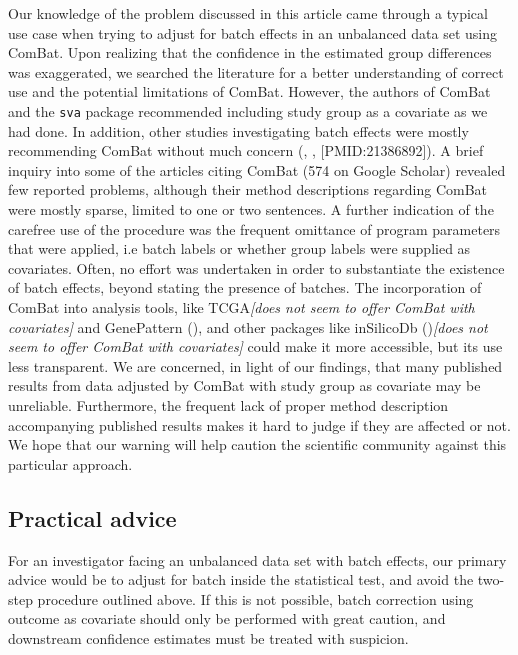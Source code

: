 \documentclass{bio}
\newcommand\COMMENT[2]{\textcolor{COMMENTcol}{#1}\NOTE{#2}}
\newcommand\NB[1]{\textcolor{NBcol}{\textit{#1}}}
\newcommand\NOTE[1]{\NB{[#1]}}
\newcommand\CITE[1]{\textcolor{CITEcol}{[#1]}}
\begin{document}
Our knowledge of the problem discussed in this article came through a typical use case when trying to adjust for batch effects in an unbalanced data set using ComBat. Upon realizing that the confidence in the estimated group differences was exaggerated, we searched the literature for a better understanding of correct use and the potential limitations of ComBat. However, the authors of ComBat and the \texttt{sva} package recommended including study group as a covariate as we had done. In addition, other studies investigating batch effects were mostly recommending ComBat without much concern (\citealp{Kupfer2012}, \citealp{Kitchen2011}, \CITE{PMID:21386892}). A brief inquiry into  some of the articles citing ComBat (574 on Google Scholar) revealed few reported problems, although their method descriptions regarding ComBat were mostly sparse, limited to one or two sentences. A further indication of the carefree use of the procedure was the frequent omittance of program parameters that were applied, i.e batch labels or whether group labels were supplied as covariates. Often, no effort was undertaken in order to substantiate the existence of batch effects, beyond stating the presence of batches. The incorporation of ComBat into analysis tools, like \COMMENT{TCGA}{does not seem to offer ComBat with covariates} and GenePattern (\citealp{Reich2006}), and other packages like \COMMENT{inSilicoDb (\citealp{Taminau2011})}{does not seem to offer ComBat with covariates} could make it more accessible, but its use less transparent. We are concerned, in light of our findings, that many published results from data adjusted by ComBat with study group as covariate may be unreliable. Furthermore, the frequent lack of proper method description accompanying published results makes it hard to judge if they are affected or not. We hope that our warning will help caution the scientific community against this particular approach.


\subsection{Practical advice}

For an investigator facing an unbalanced data set with batch effects, our primary advice would be to adjust for batch inside the statistical test, and avoid the two-step procedure outlined above. If this is not possible, batch correction using outcome as covariate should only be performed with great caution, and downstream confidence estimates must be treated with suspicion.
\end{document}
